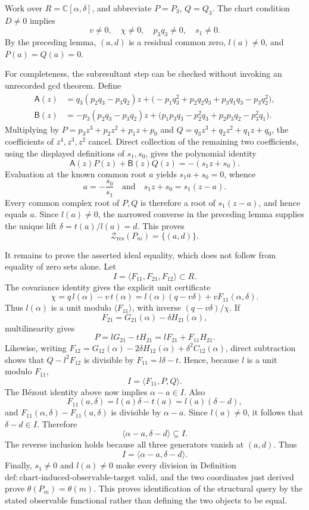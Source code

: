 Work over \(R=\mathbb C[\alpha,\delta]\), and abbreviate \(P=P_3\), \(Q=Q_3\). The chart condition \(D\neq0\) implies
\[
v\neq0,
\quad \chi\neq0,
\quad p_3q_3\neq0,
\quad s_1\neq0.
\]
By the preceding lemma, \((a,d)\) is a residual common zero, \(l(a)\neq0\), and \(P(a)=Q(a)=0\).

For completeness, the subresultant step can be checked without invoking an unrecorded gcd theorem. Define
\[
\begin{aligned}
\mathsf A(z)
&=q_3(p_2q_3-p_3q_2)z
+  \bigl(-p_1q_3^2+p_2q_2q_3+p_3q_1q_3-p_3q_2^2\bigr),\\
\mathsf B(z)
&=-p_3(p_2q_3-p_3q_2)z
+  \bigl(p_1p_3q_3-p_2^2q_3+p_2p_3q_2-p_3^2q_1\bigr).
\end{aligned}
\]
Multiplying by \(P=p_3z^3+p_2z^2+p_1z+p_0\) and \(Q=q_3z^3+q_2z^2+q_1z+q_0\), the coefficients of \(z^4,z^3,z^2\) cancel. Direct collection of the remaining two coefficients, using the displayed definitions of \(s_1,s_0\), gives the polynomial identity
\[
\mathsf A(z)P(z)+\mathsf B(z)Q(z)=-(s_1z+s_0).
\]
Evaluation at the known common root \(a\) yields \(s_1a+s_0=0\), whence
\[
a=-\frac{s_0}{s_1}
\quad\text{and}\quad
s_1z+s_0=s_1(z-a).
\]
Every common complex root of \(P,Q\) is therefore a root of \(s_1(z-a)\), and hence equals \(a\). Since \(l(a)\neq0\), the narrowed converse in the preceding lemma supplies the unique lift \(\delta=t(a)/l(a)=d\). This proves
\[
\mathcal Z_{\mathrm{res}}(P_m)=\{(a,d)\}.
\]

It remains to prove the asserted ideal equality, which does not follow from equality of zero sets alone. Let
\[
I=\langle F_{11},F_{21},F_{12}\rangle\subset R.
\]
The covariance identity gives the explicit unit certificate
\[
\chi=q\,l(\alpha)-v\,t(\alpha)
=l(\alpha)(q-v\delta)+vF_{11}(\alpha,\delta).
\]
Thus \(l(\alpha)\) is a unit modulo \(\langle F_{11}\rangle\), with inverse \((q-v\delta)/\chi\). If
\[
F_{21}=G_{21}(\alpha)-\delta H_{21}(\alpha),
\]
multilinearity gives
\[
P=lG_{21}-tH_{21}=lF_{21}+F_{11}H_{21}.
\]
Likewise, writing \(F_{12}=G_{12}(\alpha)-2\delta H_{12}(\alpha)+\delta^2C_{12}(\alpha)\), direct subtraction shows that \(Q-l^2F_{12}\) is divisible by \(F_{11}=l\delta-t\). Hence, because \(l\) is a unit modulo \(F_{11}\),
\[
I=\langle F_{11},P,Q\rangle.
\]
The Bézout identity above now implies \(\alpha-a\in I\). Also
\[
F_{11}(a,\delta)=l(a)\delta-t(a)=l(a)(\delta-d),
\]
and \(F_{11}(\alpha,\delta)-F_{11}(a,\delta)\) is divisible by \(\alpha-a\). Since \(l(a)\neq0\), it follows that \(\delta-d\in I\). Therefore
\[
\langle\alpha-a,\delta-d\rangle\subseteq I.
\]
The reverse inclusion holds because all three generators vanish at \((a,d)\). Thus
\[
I=\langle\alpha-a,\delta-d\rangle.
\]
Finally, \(s_1\neq0\) and \(l(a)\neq0\) make every division in Definition \(\mathrm{def:chart\mbox{-}induced\mbox{-}observable\mbox{-}target}\) valid, and the two coordinates just derived prove \(\theta(P_m)=\theta(m)\). This proves identification of the structural query by the stated observable functional rather than defining the two objects to be equal.

